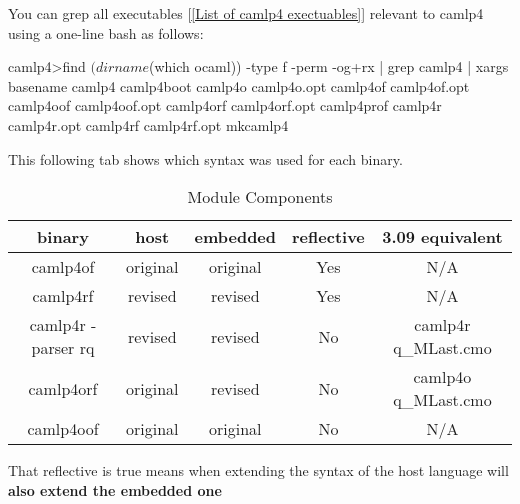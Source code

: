 You can grep all executables [\ref{List of camlp4 exectuables}]
relevant to camlp4 using a one-line bash as follows:

\begin{bashcode}
camlp4>find $(dirname $(which ocaml)) -type f -perm -og+rx | grep camlp4 | xargs basename
camlp4
camlp4boot
camlp4o
camlp4o.opt
camlp4of
camlp4of.opt
camlp4oof
camlp4oof.opt
camlp4orf
camlp4orf.opt
camlp4prof
camlp4r
camlp4r.opt
camlp4rf
camlp4rf.opt
mkcamlp4
\end{bashcode}

This following tab shows which syntax was used for each binary.
\begin{table}
  \centering
  \begin{tabular}{|c|c|c|c|c|}
    \hline
    binary                         & host     & embedded & reflective    & 3.09 equivalent  \\
    \hline
    camlp4of          & original & original & Yes        & N/A                 \\
    camlp4rf          & revised  & revised  & Yes        & N/A                 \\
    camlp4r -parser rq & revised  & revised  & No         & camlp4r q\_MLast.cmo \\
    camlp4orf         & original & revised  & No         & camlp4o q\_MLast.cmo \\
    camlp4oof         & original & original & No         & N/A                 \\
    \hline
  \end{tabular}
  \caption{Module Components}
  \label{tab:camlp4_module_components}
\end{table}

That reflective is true means when extending the syntax of the host
language will \textbf{ also extend the embedded one}

